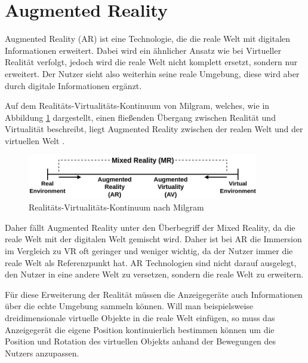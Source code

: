   \section{Augmented Reality}
  Augmented Reality (AR) ist eine Technologie, die die reale Welt mit digitalen Informationen erweitert.
  Dabei wird ein ähnlicher Ansatz wie bei Virtueller Realität verfolgt, jedoch wird die reale Welt nicht komplett ersetzt, sondern nur erweitert.
  Der Nutzer sieht also weiterhin seine reale Umgebung, diese wird aber durch digitale Informationen ergänzt.

  Auf dem Realitäts-Virtualitäts-Kontinuum von Milgram, welches, wie in Abbildung \ref{fig:rv-continuum} dargestellt, einen fließenden Übergang zwischen Realität und Virtualität beschreibt, liegt Augmented Reality zwischen der realen Welt und der virtuellen Welt \autocite[vgl.][S.9]{milgram1999}.

  \begin{figure}[H]
    \centering
    \includegraphics[width=0.9\textwidth]{images/RV-Continuum.png}
    \caption{Realitäts-Virtualitäts-Kontinuum nach Milgram}
    \label{fig:rv-continuum}
  \end{figure}

  Daher fällt Augmented Reality unter den Überbegriff der Mixed Reality, da die reale Welt mit der digitalen Welt gemischt wird.
  Daher ist bei AR die Immersion im Vergleich zu VR oft geringer und weniger wichtig, da der Nutzer immer die reale Welt als Referenzpunkt hat.
  AR Technologien sind nicht darauf ausgelegt, den Nutzer in eine andere Welt zu versetzen, sondern die reale Welt zu erweitern.

  Für diese Erweiterung der Realität müssen die Anzeigegeräte auch Informationen über die echte Umgebung sammeln können.
  Will man beispielsweise dreidimensionale virtuelle Objekte in die reale Welt einfügen, so muss das Anzeigegerät die eigene Position kontinuierlich bestimmen können um die Position und Rotation des virtuellen Objekts anhand der Bewegungen des Nutzers anzupassen.

